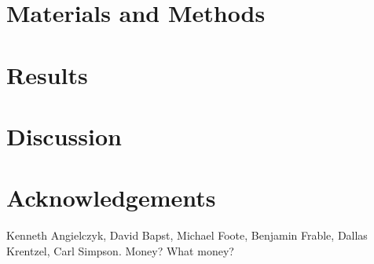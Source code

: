 \documentclass[12pt,letterpaper]{article}
\begin{document}
\section{Materials and Methods}
%
%
%
%
%
%
%
\lipsum[1-3]


\section{Results}
\lipsum[1-3]


\section{Discussion}
\lipsum[1-3]


\section*{Acknowledgements}
Kenneth Angielczyk, David Bapst, Michael Foote, Benjamin Frable, Dallas Krentzel, Carl Simpson. Money? What money?



\end{document}
